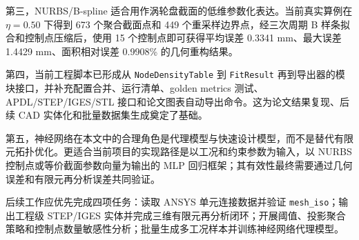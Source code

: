 \documentclass{FRB-style}
\newcommand{\codepath}[1]{\texttt{#1}}
\begin{document}
第三，NURBS/B-spline 适合用作涡轮盘截面的低维参数化表达。当前真实算例在 $\eta=0.50$ 下得到 673 个聚合截面点和 449 个重采样边界点，经三次周期 B 样条拟合和控制点压缩后，使用 15 个控制点即可获得平均误差 0.3341 mm、最大误差 1.4429 mm、面积相对误差 0.9908\% 的几何重构结果。

第四，当前工程脚本已形成从 \codepath{NodeDensityTable} 到 \codepath{FitResult} 再到导出器的模块接口，并补充配置合并、运行清单、golden metrics 测试、APDL/STEP/IGES/STL 接口和论文图表自动导出命令。这为论文结果复现、后续 CAD 实体化和批量数据集生成奠定了基础。

第五，神经网络在本文中的合理角色是代理模型与快速设计模型，而不是替代有限元拓扑优化。更适合当前项目的实现路径是以工况和约束参数为输入，以 NURBS 控制点或等价截面参数向量为输出的 MLP 回归框架；其有效性最终需要通过几何误差和有限元再分析误差共同验证。

后续工作应优先完成四项任务：读取 ANSYS 单元连接数据并验证 \codepath{mesh\_iso}；输出工程级 STEP/IGES 实体并完成三维有限元再分析闭环；开展阈值、投影聚合策略和控制点数量敏感性分析；批量生成多工况样本并训练神经网络代理模型。
\end{document}

